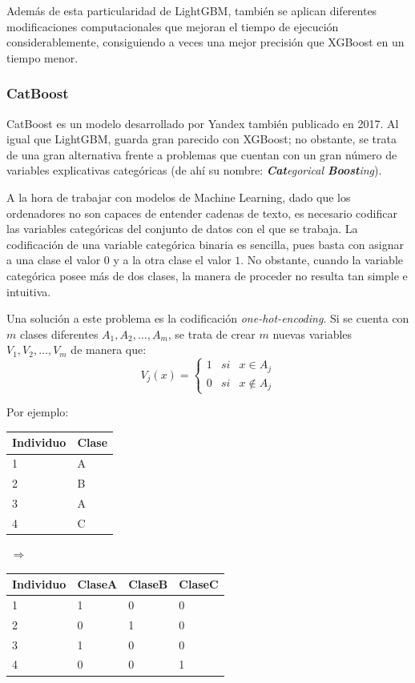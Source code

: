 \documentclass[12pt,twoside]{article}
\begin{document}
Además de esta particularidad de LightGBM, también se aplican diferentes modificaciones computacionales que mejoran el tiempo de ejecución considerablemente, consiguiendo a veces una mejor precisión que XGBoost en un tiempo menor.



\subsubsection{CatBoost} \label{sec:CatBoost}

CatBoost es un modelo desarrollado por Yandex también publicado en 2017. Al igual que LightGBM, guarda gran parecido con XGBoost; no obstante, se trata de una gran alternativa frente a problemas que cuentan con un gran número de variables explicativas categóricas (de ahí su nombre: \textit{\textbf{Cat}egorical \textbf{Boost}ing}).

A la hora de trabajar con modelos de Machine Learning, dado que los ordenadores no son capaces de entender cadenas de texto, es necesario codificar las variables categóricas del conjunto de datos con el que se trabaja. La codificación de una variable categórica binaria es sencilla, pues basta con asignar a una clase el valor $0$ y a la otra clase el valor $1$. No obstante, cuando la variable categórica posee más de dos clases, la manera de proceder no resulta tan simple e intuitiva.

Una solución a este problema es la codificación \textit{one-hot-encoding}. Si se cuenta con $m$ clases diferentes $A_1, A_2, \dots, A_m$, se trata de crear $m$ nuevas variables $V_1, V_2, \dots, V_m$ de manera que:
\begin{equation*}
V_j(x) = 
\left\{
\begin{array}{ccc}
1 & si & x \in A_j \\
0 & si & x \not\in A_j
\end{array}
\right.
\end{equation*}

Por ejemplo:
\begin{center}
\begin{tabular}{|l|l|}
\hline
Individuo & Clase \\ \hline
1         & A     \\ \hline
2         & B     \\ \hline
3         & A     \\ \hline
4         & C     \\ \hline
\end{tabular}
$\, \, \Rightarrow \, \,$
\begin{tabular}{|l|l|l|l|}
\hline
Individuo & ClaseA & ClaseB & ClaseC \\ \hline
1         & 1 & 0 & 0     \\ \hline
2         & 0 & 1 & 0     \\ \hline
3         & 1 & 0 & 0     \\ \hline
4         & 0 & 0 & 1     \\ \hline
\end{tabular}
\end{center}
\end{document}
